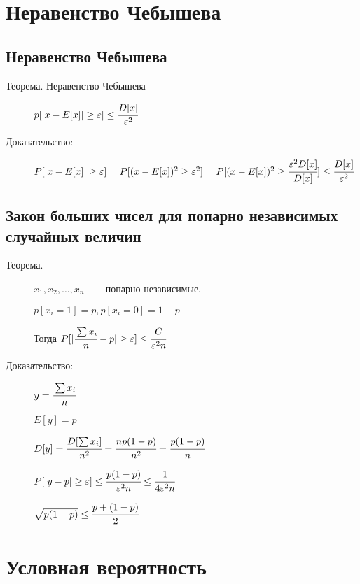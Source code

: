 \documentclass[12pt]{article}
\renewcommand{\epsilon}{\varepsilon}
\begin{document}
\section{Неравенство Чебышева}

\subsection{Неравенство Чебышева}

\begin{description}
\item[Теорема. Неравенство Чебышева]

$p[|x - E[x]| \ge \epsilon] \le \cfrac{D[x]}{\epsilon^2}$

\item[Доказательство:]

$P[|x - E[x]| \ge \epsilon] = P[(x - E[x])^2 \ge \epsilon^2] = P[(x - E[x])^2 \ge \cfrac{\epsilon^2 D[x]}{D[x]}] \le \cfrac{D[x]}{\epsilon^2}$
\end{description}

\subsection{Закон больших чисел для попарно независимых случайных величин}

\begin{description}

\item [Теорема.]
$x_1, x_2, \ldots, x_n$ ~--- попарно независимые.

$p[x_i = 1] = p, p[x_i = 0] = 1 - p$

Тогда $P[|\cfrac{\sum x_i}{n} - p| \ge \epsilon] \le \cfrac{C}{\epsilon^2 n}$

\item[Доказательство:]

$y = \cfrac{\sum x_i}{n}$

$E[y] = p$

$D[y] = \cfrac{D[\sum x_i]}{n^2} = \cfrac{n p(1 - p)}{n^2} = \cfrac{p (1 - p)}{n}$

$P[|y - p| \ge \epsilon] \le \cfrac{p(1 - p)}{\epsilon^2 n} \le \cfrac{1}{4 \epsilon^2 n}$

$\sqrt{p(1 - p)} \le \cfrac{p + (1 - p)}{2}$

\end{description}

\section{Условная вероятность}
\end{document}

